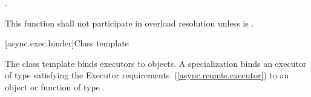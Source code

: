 \begin{itemdescr}
\pnum
\returns {}.

\pnum
\remarks This function shall not participate in overload resolution unless
 is .
\end{itemdescr}



[async.exec.binder]{Class template }

%
\pnum
The class template  binds executors to objects.
A specialization  binds
an executor of type  satisfying the Executor requirements~(\ref{async.reqmts.executor})
to an object or function of type .


